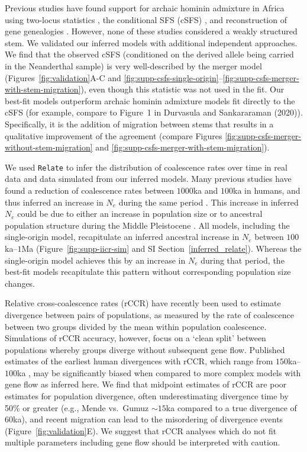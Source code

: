 \documentclass[]{article}
\begin{document}
Previous studies have found support for archaic hominin admixture in Africa
using two-locus statistics \citep{Hsieh2016-gk,Ragsdale2019-nt}, the
conditional SFS (cSFS) \citep{Durvasula2020-td}, and reconstruction of gene
genealogies \citep{Speidel2019-nj}. However, none of these studies considered a
weakly structured stem. We validated our inferred models with additional
independent approaches. We find that the observed cSFS (conditioned on the
derived allele being carried in the Neanderthal sample) is very well-described
by the merger model (Figures~\ref{fig:validation}A-C and
\ref{fig:supp-csfs-single-origin}--\ref{fig:supp-csfs-merger-with-stem-migration}),
even though this statistic was not used in the fit. Our best-fit models
outperform archaic hominin admixture models fit directly to the cSFS (for
example, compare to Figure~1 in Durvasula and Sankararaman
(2020)\citep{Durvasula2020-td}). Specifically, it is the addition of migration
between stems that results in a qualitative improvement of the agreement
(compare Figures \ref{fig:supp-csfs-merger-without-stem-migration}  and
\ref{fig:supp-csfs-merger-with-stem-migration}).

We used \texttt{Relate} \citep{Speidel2019-nj} to infer the distribution of
coalescence rates over time in real data and data simulated from our inferred
models. Many previous studies have found a reduction of coalescence rates
between $1000$ka and $100$ka in humans, and thus inferred an increase in $N_e$
during the same period \citep{Li2011-le}.  This increase in inferred $N_e$
could be due to either an increase in population size or to ancestral
population structure during the Middle Pleistocene \citep{Mazet2016-wn}.  All
models, including the single-origin model, recapitulate an inferred ancestral
increase in $N_e$ between $100$ka--$1$Ma (Figure~\ref{fig:supp-iicr-sim} and SI
Section~\ref{inferred_relate}). Whereas the single-origin model achieves this
by an increase in $N_e$ during that period, the best-fit models recapitulate
this pattern without corresponding population size changes.     

Relative cross-coalescence rates (rCCR) have recently been used to estimate
divergence between pairs of populations, as measured by the rate of coalescence
between two groups divided by the mean within population coalescence.
Simulations of rCCR accuracy, however, focus on a ‘clean split’ between
populations whereby groups diverge without subsequent gene flow.  Published
estimates of the earliest human divergences with rCCR, which range from
$150$ka--$100$ka \citep{Bergstrom2021-iw}, may be significantly biased when
compared to more complex models with gene flow as inferred here. We find that
midpoint estimates of rCCR are poor estimates for population divergence, often
underestimating divergence time by 50\% or greater (e.g., Mende vs.\ Gumuz
$\sim15$ka compared to a true divergence of $60$ka), and recent migration can
lead to the misordering of divergence events (Figure~\ref{fig:validation}E). We
suggest that rCCR analyses which do not fit multiple parameters including gene
flow should be interpreted with caution.
\end{document}
